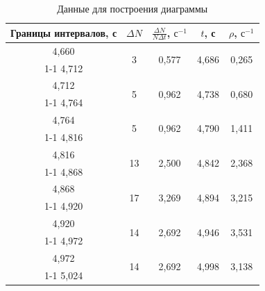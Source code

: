 \documentclass[a4paper,12pt]{article}
\begin{document}
\begin{table}[H]
    \centering
    \caption{Данные для построения диаграммы}
    \label{tab:data-for-building-the-chart}
    \begin{tabular}{|c|c|c|c|c|}
        \hline
        Границы интервалов, с
        & $\Delta N$
        & $\frac{\Delta N}{N\Delta t}$, $\text{с}^{-1}$
        & $t$, с
        & $\rho$, $\text{с}^{-1}$ \\ \hline

        4{,}660 & \multirow{2}{*}{3}
        & \multirow{2}{*}{0{,}577}
        & \multirow{2}{*}{4{,}686}
        & \multirow{2}{*}{0{,}265} \\ \cline{1-1}
        4{,}712 & & & & \\ \hline

        4{,}712 & \multirow{2}{*}{5}
        & \multirow{2}{*}{0{,}962}
        & \multirow{2}{*}{4{,}738}
        & \multirow{2}{*}{0{,}680} \\ \cline{1-1}
        4{,}764 & & & & \\ \hline

        4{,}764 & \multirow{2}{*}{5}
        & \multirow{2}{*}{0{,}962}
        & \multirow{2}{*}{4{,}790}
        & \multirow{2}{*}{1{,}411} \\ \cline{1-1}
        4{,}816 & & & & \\ \hline

        4{,}816 & \multirow{2}{*}{13}
        & \multirow{2}{*}{2{,}500}
        & \multirow{2}{*}{4{,}842}
        & \multirow{2}{*}{2{,}368} \\ \cline{1-1}
        4{,}868 & & & & \\ \hline

        4{,}868 & \multirow{2}{*}{17}
        & \multirow{2}{*}{3{,}269}
        & \multirow{2}{*}{4{,}894}
        & \multirow{2}{*}{3{,}215} \\ \cline{1-1}
        4{,}920 & & & & \\ \hline

        4{,}920 & \multirow{2}{*}{14}
        & \multirow{2}{*}{2{,}692}
        & \multirow{2}{*}{4{,}946}
        & \multirow{2}{*}{3{,}531} \\ \cline{1-1}
        4{,}972 & & & & \\ \hline

        4{,}972 & \multirow{2}{*}{14}
        & \multirow{2}{*}{2{,}692}
        & \multirow{2}{*}{4{,}998}
        & \multirow{2}{*}{3{,}138} \\ \cline{1-1}
        5{,}024 & & & & \\ \hline


\end{tabular}
\end{table}
\end{document}
